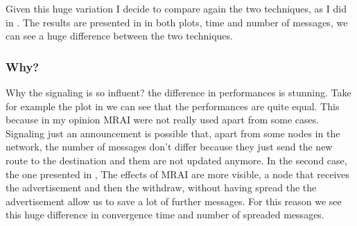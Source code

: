 \documentclass[10pt,conference,letterpaper]{IEEEtran}
\begin{document}
Given this huge variation I decide to compare again the two techniques, as I did
in .
The results are presented in  in both plots, time 
and number of messages, we can see a huge difference between the two techniques.

\subsubsection{Why?}

Why the signaling is so influent? the difference in performances is stunning.
Take for example the plot in  we can see
that the performances are quite equal.
This because in my opinion \ac{MRAI} were not really used apart from some cases.
Signaling just an announcement is possible that, apart from some nodes in the
network, the number of messages don't differ because they just send the new 
route to the destination and them are not updated anymore.
In the second case, the one presented in ,
The effects of \ac{MRAI} are more visible, a node that receives the advertisement
and then the withdraw, without having spread the the advertisement allow us 
to save a lot of further messages.
For this reason we see this huge difference in convergence time and
number of spreaded messages.
\end{document}
